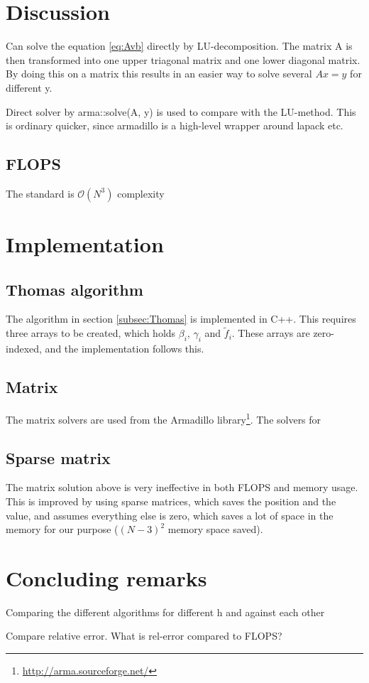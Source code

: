 \documentclass[11pt,a4paper,english,draft]{article}
\numberwithin{equation}{section}
\newcommand{\bigO}[1]{\mathcal{O}\left( #1 \right)}
\begin{document}
\section{Discussion}

Can solve the equation \eqref{eq:Avb} directly by LU-decomposition.
The matrix A is then transformed into one upper triagonal matrix and
one lower diagonal matrix. By doing this on a matrix this results in an
easier way to solve several $Ax = y$ for different y.

Direct solver by arma::solve(A, y) is used to compare with the LU-method.
This is ordinary quicker, since armadillo is a high-level wrapper around
lapack etc.

\subsection{FLOPS}
The standard is $\bigO{N^3}$ complexity


\section{Implementation}

\subsection{Thomas algorithm}

The algorithm in section \ref{subsec:Thomas} is implemented in C++.
This requires three arrays to be created, which holds $\beta_i$, $\gamma_i$
and $\tilde{f}_i$. These arrays are zero-indexed, and the implementation
follows this.


\subsection{Matrix}

The matrix solvers are used from the Armadillo 
library\footnote{\url{http://arma.sourceforge.net/}}. 
The solvers for 


\subsection{Sparse matrix}

The matrix solution above is very ineffective in both FLOPS and memory usage.
This is improved by using sparse matrices, which saves the position and the value,
and assumes everything else is zero, which saves a lot of space in the 
memory for our purpose ($(N-3)^2$ memory space saved).

\section{Concluding remarks}


Comparing the different algorithms for different h and against each other

Compare relative error. What is rel-error compared to FLOPS?
\end{document}
